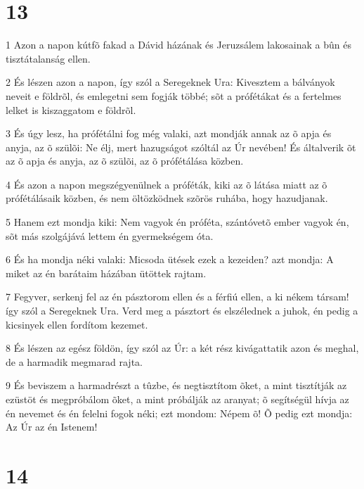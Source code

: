 \chapter{13}

\par 1 Azon a napon kútfõ fakad a Dávid házának és Jeruzsálem lakosainak a bûn és tisztátalanság ellen.
\par 2 És lészen azon a napon, így szól a Seregeknek Ura: Kivesztem a bálványok neveit e földrõl, és emlegetni sem fogják többé; sõt a prófétákat és a fertelmes lelket is kiszaggatom e földrõl.
\par 3 És úgy lesz, ha prófétálni fog még valaki, azt mondják annak az õ apja és anyja, az õ szülõi: Ne élj, mert hazugságot szóltál az Úr nevében! És általverik õt az õ apja és anyja, az õ szülõi, az õ prófétálása közben.
\par 4 És azon a napon megszégyenülnek a próféták, kiki az õ látása miatt az õ prófétálásaik közben, és nem öltözködnek szõrös ruhába, hogy hazudjanak.
\par 5 Hanem ezt mondja kiki: Nem vagyok én próféta, szántóvetõ ember vagyok én, sõt más szolgájává lettem én gyermekségem óta.
\par 6 És ha mondja néki valaki: Micsoda ütések ezek a kezeiden? azt mondja: A miket az én barátaim házában ütöttek rajtam.
\par 7 Fegyver, serkenj fel az én pásztorom ellen és a férfiú ellen, a ki nékem társam! így szól a Seregeknek Ura. Verd meg a pásztort és elszélednek a juhok, én pedig a kicsinyek ellen fordítom kezemet.
\par 8 És lészen az egész földön, így szól az Úr: a két rész kivágattatik azon és meghal, de a harmadik megmarad rajta.
\par 9 És beviszem a harmadrészt a tûzbe, és negtisztítom õket, a mint tisztítják az ezüstöt és megpróbálom õket, a mint próbálják az aranyat; õ segítségül hívja az én nevemet és én felelni fogok néki; ezt mondom: Népem õ! Õ pedig ezt mondja: Az Úr az én Istenem!

\chapter{14}

